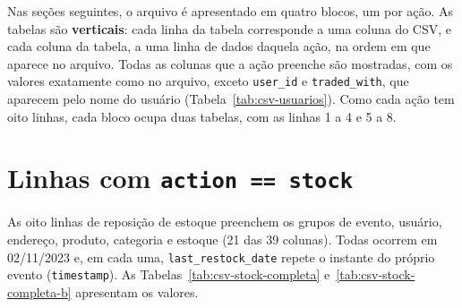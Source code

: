 Nas seções seguintes, o arquivo é apresentado em quatro blocos, um por ação. As tabelas são
\textbf{verticais}: cada linha da tabela corresponde a uma coluna do CSV, e cada coluna da
tabela, a uma linha de dados daquela ação, na ordem em que aparece no arquivo. Todas as
colunas que a ação preenche são mostradas, com os valores exatamente como no arquivo,
exceto \texttt{user\_id} e \texttt{traded\_with}, que aparecem pelo nome do usuário
(Tabela~\ref{tab:csv-usuarios}). Como cada ação tem oito linhas, cada bloco ocupa duas
tabelas, com as linhas 1 a 4 e 5 a 8.

\section{Linhas com \texttt{action == stock}}

As oito linhas de reposição de estoque preenchem os grupos de evento, usuário, endereço,
produto, categoria e estoque (21 das 39 colunas). Todas ocorrem em 02/11/2023 e, em cada
uma, \texttt{last\_restock\_date} repete o instante do próprio evento
(\texttt{timestamp}). As Tabelas~\ref{tab:csv-stock-completa}
e~\ref{tab:csv-stock-completa-b} apresentam os valores.

